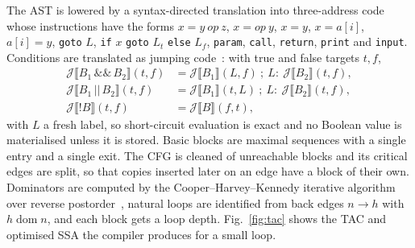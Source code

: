 \documentclass{ieeeaccess}
\newcommand{\tm}[1]{\texttt{#1}}
\begin{document}
The AST is lowered by a syntax-directed translation into three-address
code whose instructions have the forms $x=y\ \mathit{op}\ z$,
$x=\mathit{op}\ y$, $x=y$, $x=a[i]$, $a[i]=y$, \tm{goto} $L$,
\tm{if} $x$ \tm{goto} $L_t$ \tm{else} $L_f$, \tm{param}, \tm{call},
\tm{return}, \tm{print} and \tm{input}. Conditions are translated as
jumping code~\cite{aho2006dragon}: with true and false targets $t,f$,
\begin{equation}
\begin{aligned}
\mathcal{J}\llbracket B_1 \,\tm{\&\&}\, B_2\rrbracket(t,f) &=
 \mathcal{J}\llbracket B_1\rrbracket(L,f)\ ;\ L{:}\ \mathcal{J}\llbracket B_2\rrbracket(t,f),\\
\mathcal{J}\llbracket B_1 \,\tm{||}\, B_2\rrbracket(t,f) &=
 \mathcal{J}\llbracket B_1\rrbracket(t,L)\ ;\ L{:}\ \mathcal{J}\llbracket B_2\rrbracket(t,f),\\
\mathcal{J}\llbracket \tm{!}B\rrbracket(t,f) &= \mathcal{J}\llbracket B\rrbracket(f,t),
\end{aligned}
\label{eq:jump}
\end{equation}
with $L$ a fresh label, so short-circuit evaluation is exact and no
Boolean value is materialised unless it is stored. Basic blocks are
maximal sequences with a single entry and a single exit. The CFG is
cleaned of unreachable blocks and its critical edges are split, so that
copies inserted later on an edge have a block of their own. Dominators
are computed by the Cooper--Harvey--Kennedy iterative algorithm over
reverse postorder~\cite{cooper2001dom}, natural loops are identified
from back edges $n\to h$ with $h \operatorname{dom} n$, and each block
gets a loop depth. Fig.~\ref{fig:tac} shows the TAC and optimised SSA
the compiler produces for a small loop.
\end{document}
